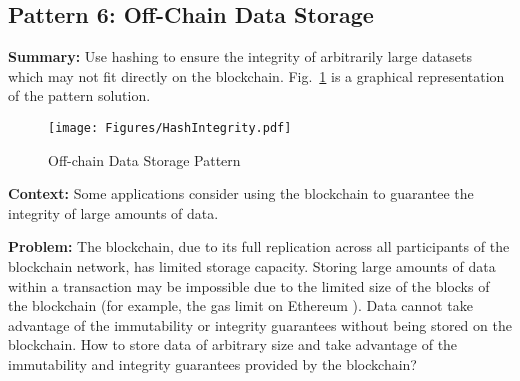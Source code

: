 \subsection{ \textbf{Pattern 6: Off-Chain Data Storage}}
\label{sec:hash}

\vspace{0.5em}\noindent \textbf{Summary:} Use hashing to ensure the integrity of arbitrarily large datasets which may not fit directly on the blockchain. Fig.~\ref{fig:hashintegrity} is a graphical representation of the pattern solution.

\begin{figure}[t]
\begin{center}
\texttt{[image: Figures/HashIntegrity.pdf]}
\caption{Off-chain Data Storage Pattern}\label{fig:hashintegrity}
\end{center}
\end{figure}

\vspace{0.5em}\noindent \textbf{Context:} Some applications consider using the blockchain to guarantee the integrity of large amounts of data.


\vspace{0.5em}\noindent \textbf{Problem:} The blockchain, due to its full replication across all participants of the blockchain network, has limited storage capacity. Storing large amounts of data within a transaction may be impossible due to the limited size of the blocks of the blockchain (for example, the gas limit on Ethereum%
). Data cannot take advantage of the immutability or integrity guarantees without being stored on the blockchain. How to store data of arbitrary size and take advantage of the immutability and integrity guarantees provided by the blockchain?


